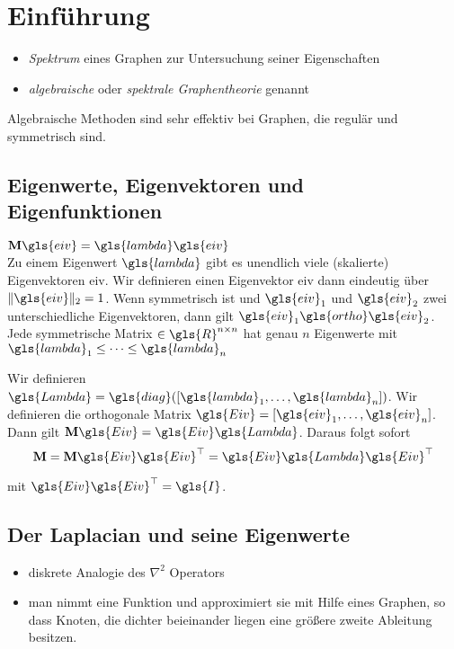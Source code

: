 \section{Einführung}

\begin{itemize}
  \item \emph{Spektrum} eines Graphen zur Untersuchung seiner Eigenschaften
  \item \emph{algebraische} oder \emph{spektrale Graphentheorie} genannt
\end{itemize}

Algebraische Methoden sind sehr effektiv bei Graphen, die regulär und symmetrisch sind.

\subsection{Eigenwerte, Eigenvektoren und Eigenfunktionen}

$\ma{M}\gls{eiv} = \gls{lambda}\gls{eiv}$\\
Zu einem Eigenwert $\gls{lambda}$ gibt es unendlich viele (skalierte) Eigenvektoren \gls{eiv}.
Wir definieren einen Eigenvektor \gls{eiv} dann eindeutig über $\left\|\gls{eiv}\right\|_2 = 1$.
Wenn  symmetrisch ist und $\gls{eiv}_1$ und $\gls{eiv}_2$ zwei unterschiedliche Eigenvektoren, dann gilt $\gls{eiv}_1 \gls{ortho} \gls{eiv}_2$.
Jede symmetrische Matrix $\in \gls{R}^{n \times n}$ hat genau $n$ Eigenwerte mit $\gls{lambda}_1 \leq \cdots \leq \gls{lambda}_n$

Wir definieren $\gls{Lambda} = \gls{diag}\left(\left[\gls{lambda}_1, \ldots, \gls{lambda}_n\right]\right)$.
Wir definieren die orthogonale Matrix $\gls{Eiv} = \left[\gls{eiv}_1, \ldots, \gls{eiv}_n\right]$.
Dann gilt $\ma{M}\gls{Eiv} = \gls{Eiv}\gls{Lambda}$.
Daraus folgt sofort
\begin{equation}
  \ma{M} = \ma{M}\gls{Eiv}\gls{Eiv}^{\top} = \gls{Eiv}\gls{Lambda}\gls{Eiv}^{\top}
\end{equation}

mit $\gls{Eiv}\gls{Eiv}^{\top} = \gls{I}$.


\subsection{Der Laplacian und seine Eigenwerte}

\begin{itemize}
  \item diskrete Analogie des $\nabla^2$ Operators
  \item man nimmt eine Funktion und approximiert sie mit Hilfe eines Graphen, so dass Knoten, die dichter beieinander liegen eine größere zweite Ableitung besitzen.
\end{itemize}

